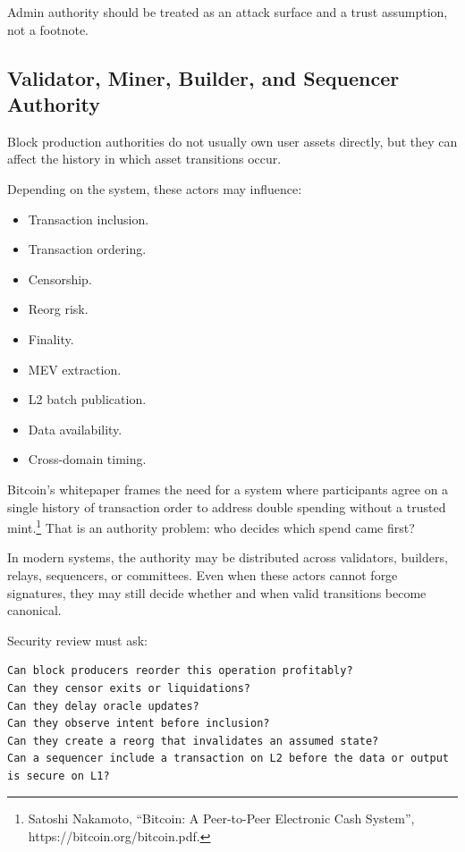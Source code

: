 Admin authority should be treated as an attack surface and a trust
assumption, not a footnote.

\subsection{Validator, Miner, Builder, and Sequencer Authority}

Block production authorities do not usually own user assets directly,
but they can affect the history in which asset transitions occur.

Depending on the system, these actors may influence:

\begin{itemize}
\tightlist
\item
  Transaction inclusion.
\item
  Transaction ordering.
\item
  Censorship.
\item
  Reorg risk.
\item
  Finality.
\item
  MEV extraction.
\item
  L2 batch publication.
\item
  Data availability.
\item
  Cross-domain timing.
\end{itemize}

Bitcoin's whitepaper frames the need for a system where participants
agree on a single history of transaction order to address double
spending without a trusted mint.\footnote{Satoshi Nakamoto, ``Bitcoin: A
  Peer-to-Peer Electronic Cash System'',
  https://bitcoin.org/bitcoin.pdf.} That is an authority problem: who
decides which spend came first?

In modern systems, the authority may be distributed across validators,
builders, relays, sequencers, or committees. Even when these actors
cannot forge signatures, they may still decide whether and when valid
transitions become canonical.

Security review must ask:

\begin{lstlisting}
Can block producers reorder this operation profitably?
Can they censor exits or liquidations?
Can they delay oracle updates?
Can they observe intent before inclusion?
Can they create a reorg that invalidates an assumed state?
Can a sequencer include a transaction on L2 before the data or output is secure on L1?
\end{lstlisting}

